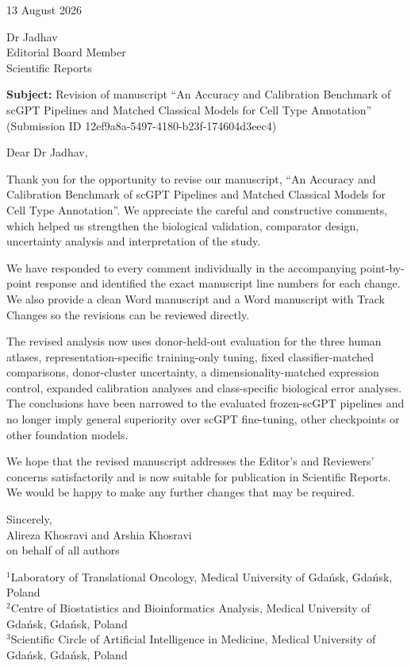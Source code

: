 \documentclass[11pt,a4paper]{article}
\begin{document}
\begin{flushright}13 August 2026\end{flushright}

Dr Jadhav\\
Editorial Board Member\\
Scientific Reports

\vspace{0.4cm}
\textbf{Subject:} Revision of manuscript ``An Accuracy and Calibration Benchmark of scGPT Pipelines and Matched Classical Models for Cell Type Annotation'' (Submission ID 12ef9a8a-5497-4180-b23f-174604d3eec4)

Dear Dr Jadhav,

Thank you for the opportunity to revise our manuscript, ``An Accuracy and Calibration Benchmark of scGPT Pipelines and Matched Classical Models for Cell Type Annotation''. We appreciate the careful and constructive comments, which helped us strengthen the biological validation, comparator design, uncertainty analysis and interpretation of the study.

We have responded to every comment individually in the accompanying point-by-point response and identified the exact manuscript line numbers for each change. We also provide a clean Word manuscript and a Word manuscript with Track Changes so the revisions can be reviewed directly.

The revised analysis now uses donor-held-out evaluation for the three human atlases, representation-specific training-only tuning, fixed classifier-matched comparisons, donor-cluster uncertainty, a dimensionality-matched expression control, expanded calibration analyses and class-specific biological error analyses. The conclusions have been narrowed to the evaluated frozen-scGPT pipelines and no longer imply general superiority over scGPT fine-tuning, other checkpoints or other foundation models.

We hope that the revised manuscript addresses the Editor's and Reviewers' concerns satisfactorily and is now suitable for publication in Scientific Reports. We would be happy to make any further changes that may be required.

Sincerely,\\
Alireza Khosravi and Arshia Khosravi\\
on behalf of all authors

$^{1}$Laboratory of Translational Oncology, Medical University of Gda{\'n}sk, Gda{\'n}sk, Poland\\
$^{2}$Centre of Biostatistics and Bioinformatics Analysis, Medical University of Gda{\'n}sk, Gda{\'n}sk, Poland\\
$^{3}$Scientific Circle of Artificial Intelligence in Medicine, Medical University of Gda{\'n}sk, Gda{\'n}sk, Poland
\end{document}
